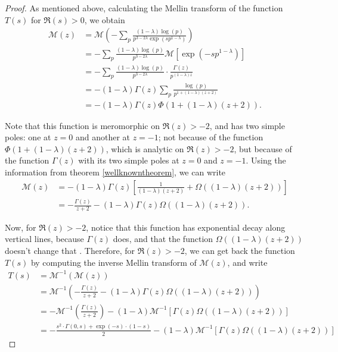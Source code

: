 \documentclass[10pt,a4paper]{amsart}
\newcommand{\difrac}{\displaystyle \frac}
\newcommand{\disum}{\displaystyle \sum}
\begin{document}
\begin{proof} As mentioned above, calculating the Mellin transform of the function $T(s)$ for $\Re(s) > 0$, we obtain \begin{equation*} \begin{split} \mathscr{M}(z) & = \mathscr{M}\left(-\disum_p \difrac{(1 - \lambda) \log(p)}{p^{3 - 2\lambda} \exp(sp^{1 - \lambda})}\right) \\ & = -\disum_p \difrac{(1 - \lambda) \log(p)}{p^{3 - 2\lambda}} \mathscr{M}[\exp(-sp^{1 - \lambda})] \\ & = -\disum_p \difrac{(1 - \lambda) \log(p)}{p^{3 - 2\lambda}} \cdot \difrac{\Gamma(z)}{p^{(1 - \lambda)z}} \\ & = -(1 - \lambda) \Gamma(z) \disum_p \difrac{\log(p)}{p^{1 + (1 - \lambda)(z + 2)}} \\ & = -(1 - \lambda) \Gamma(z) \Phi(1 + (1 - \lambda)(z + 2)). \end{split} \end{equation*}

Note that this function is meromorphic on $\Re(z) > -2$, and has two simple poles: one at $z = 0$ and another at $z = -1$; not because of the function $\Phi(1 + (1 - \lambda)(z + 2))$, which is analytic on $\Re(z) > -2$, but because of the function $\Gamma(z)$ with its two simple poles at $z = 0$ and $z = -1$. Using the information from theorem \ref{wellknowntheorem}, we can write \begin{equation*} \begin{split} \mathscr{M}(z) & = -(1 - \lambda) \Gamma(z) \left[\difrac{1}{(1 - \lambda)(z + 2)} + \Omega((1 - \lambda)(z + 2))\right] \\ & = -\difrac{\Gamma(z)}{z + 2} - (1 - \lambda) \Gamma(z) \Omega((1 - \lambda)(z + 2)). \end{split} \end{equation*}

Now, for $\Re(z) > -2$, notice that this function has exponential decay along vertical lines, because $\Gamma(z)$ does, and that the function $\Omega((1 - \lambda)(z + 2))$ doesn't change that . Therefore, for $\Re(z) > -2$, we can get back the function $T(s)$ by computing the inverse Mellin transform of $\mathscr{M}(z)$, and write \begin{equation*} \begin{split} T(s) & = \mathscr{M}^{-1}(\mathscr{M}(z)) \\ & = \mathscr{M}^{-1}\left(-\difrac{\Gamma(z)}{z + 2} - (1 - \lambda) \Gamma(z) \Omega((1 - \lambda)(z + 2))\right) \\ & = -\mathscr{M}^{-1}\left(\difrac{\Gamma(z)}{z + 2}\right) - (1 - \lambda) \mathscr{M}^{-1}[\Gamma(z) \Omega((1 - \lambda)(z + 2))] \\ & = -\difrac{s^2 \cdot \Gamma(0,s) + \exp(-s) \cdot (1-s)}{2} - (1 - \lambda) \mathscr{M}^{-1}[\Gamma(z) \Omega((1 - \lambda)(z + 2))] \end{split} \end{equation*}


\end{proof}
\end{document}
